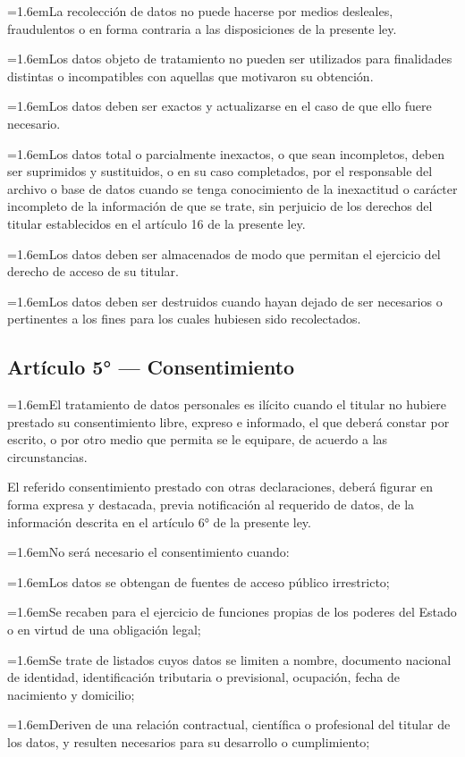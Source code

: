 \documentclass[10pt,a4paper]{article}
\newcommand{\articulo}[1]{\subsection{#1}}
\newcommand{\inciso}[2]{\par{\hangindent=1.6em\hangafter=1\makebox[1.6em][l]{#1}#2\par}}
\begin{document}
\inciso{2.}{La recolección de datos no puede hacerse por medios desleales, fraudulentos o en forma contraria a las disposiciones de la presente ley.}

\inciso{3.}{Los datos objeto de tratamiento no pueden ser utilizados para finalidades distintas o incompatibles con aquellas que motivaron su obtención.}

\inciso{4.}{Los datos deben ser exactos y actualizarse en el caso de que ello fuere necesario.}

\inciso{5.}{Los datos total o parcialmente inexactos, o que sean incompletos, deben ser suprimidos y sustituidos, o en su caso completados, por el responsable del archivo o base de datos cuando se tenga conocimiento de la inexactitud o carácter incompleto de la información de que se trate, sin perjuicio de los derechos del titular establecidos en el artículo 16 de la presente ley.}

\inciso{6.}{Los datos deben ser almacenados de modo que permitan el ejercicio del derecho de acceso de su titular.}

\inciso{7.}{Los datos deben ser destruidos cuando hayan dejado de ser necesarios o pertinentes a los fines para los cuales hubiesen sido recolectados.}

\articulo{Artículo 5° --- Consentimiento}
\inciso{1.}{El tratamiento de datos personales es ilícito cuando el titular no hubiere prestado su consentimiento libre, expreso e informado, el que deberá constar por escrito, o por otro medio que permita se le equipare, de acuerdo a las circunstancias.}

El referido consentimiento prestado con otras declaraciones, deberá figurar en forma expresa y destacada, previa notificación al requerido de datos, de la información descrita en el artículo 6° de la presente ley.

\inciso{2.}{No será necesario el consentimiento cuando:}

\inciso{a)}{Los datos se obtengan de fuentes de acceso público irrestricto;}

\inciso{b)}{Se recaben para el ejercicio de funciones propias de los poderes del Estado o en virtud de una obligación legal;}

\inciso{c)}{Se trate de listados cuyos datos se limiten a nombre, documento nacional de identidad, identificación tributaria o previsional, ocupación, fecha de nacimiento y domicilio;}

\inciso{d)}{Deriven de una relación contractual, científica o profesional del titular de los datos, y resulten necesarios para su desarrollo o cumplimiento;}
\end{document}

